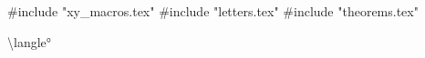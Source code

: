 #include "xy_macros.tex"
#include "letters.tex"
#include "theorems.tex"



\setcounter{tocdepth}{1}

\newcommand{\term}{\emph} %
\newcommand{\latin}{\textit} %


\newcommand{\renewoperator}[2]{\renewcommand{#1}{\operatorname{#2}}}

\newcommand{\vp}{\varphi}
\newcommand{\e}{\varepsilon}
\newcommand{\inj}{\hookrightarrow}
\newcommand{\surj}{\twoheadrightarrow}
\newcommand{\id}{\mathrm{id}}
\newcommand{\pt}{\mathrm{pt}}
\newcommand{\many}[2][\dotsb]{#2 #1 #2} %
\newcommand{\TFAE}{The following are equivalent}
\newcommand{\TODO}{\textcolor{red}{TODO}}

\let\shortmapsto\mapsto
\renewcommand{\mapsto}{\mathchoice{\longmapsto}{\shortmapsto}{\shortmapsto}{\shortmapsto}}

\def\paren[#1]{\qty(#1)}
\DeclarePairedDelimiter\ang{\langle}{\rangle}
\let\oldang\ang
\def\ang{\@ifstar{\oldang}{\oldpang*}}
\def\bkt[#1]{\qty[#1]}
\def\set[#1]{\qty{#1}}

